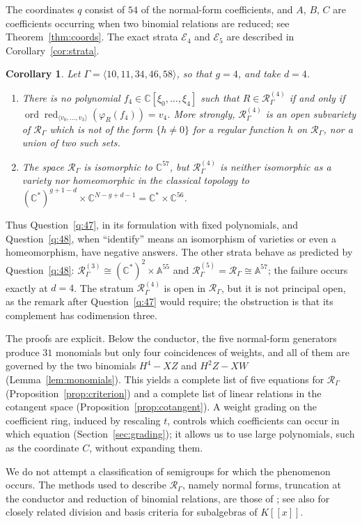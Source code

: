 \documentclass{amsart}
\newtheorem{corollary}[theorem]{Corollary}
\theoremstyle{definition}
\theoremstyle{remark}
\numberwithin{equation}{section}
\newcommand{\CC}{\mathbb{C}}
\newcommand{\AF}{\mathbb{A}}
\newcommand{\Rs}{\mathcal{R}_\Gamma}
\newcommand{\Rd}[1]{\mathcal{R}^{(#1)}_\Gamma}
\newcommand{\Ed}[1]{\mathcal{E}_{#1}}
\DeclareMathOperator{\ord}{ord}
\DeclareMathOperator{\red}{red}
\begin{document}
The coordinates $q$ consist of $54$ of the normal-form coefficients, and $A$, $B$, $C$ are coefficients occurring when two binomial relations are reduced; see Theorem~\ref{thm:coords}. The exact strata $\Ed{4}$ and $\Ed{5}$ are described in Corollary~\ref{cor:strata}.

\begin{corollary}\label{cor:answers}
Let $\Gamma=\langle 10,11,34,46,58\rangle$, so that $g=4$, and take $d=4$.
\begin{enumerate}
\item There is no polynomial $f_4\in\CC[\xi_0,\dots,\xi_4]$ such that $R\in\Rd{4}$ if and only if $\ord\red_{\langle v_0,\dots,v_3\rangle}(\varphi_R(f_4))=v_4$. More strongly, $\Rd{4}$ is an open subvariety of $\Rs$ which is not of the form $\{h\ne0\}$ for a regular function $h$ on $\Rs$, nor a union of two such sets.
\item The space $\Rs$ is isomorphic to $\CC^{57}$, but $\Rd{4}$ is neither isomorphic as a variety nor homeomorphic in the classical topology to $(\CC^*)^{g+1-d}\times\CC^{N-g+d-1}=\CC^*\times\CC^{56}$.
\end{enumerate}
\end{corollary}

Thus Question~\ref{q:47}, in its formulation with fixed polynomials, and Question~\ref{q:48}, when ``identify'' means an isomorphism of varieties or even a homeomorphism, have negative answers. The other strata behave as predicted by Question~\ref{q:48}: $\Rd{3}\cong(\CC^*)^2\times\AF^{55}$ and $\Rd{5}=\Rs\cong\AF^{57}$; the failure occurs exactly at $d=4$. The stratum $\Rd{4}$ is open in $\Rs$, but it is not principal open, as the remark after Question~\ref{q:47} would require; the obstruction is that its complement has codimension three.

The proofs are explicit. Below the conductor, the five normal-form generators produce $31$ monomials but only four coincidences of weights, and all of them are governed by the two binomials $H^4-XZ$ and $H^2Z-XW$ (Lemma~\ref{lem:monomials}). This yields a complete list of five equations for $\Rs$ (Proposition~\ref{prop:criterion}) and a complete list of linear relations in the cotangent space (Proposition~\ref{prop:cotangent}). A weight grading on the coefficient ring, induced by rescaling $t$, controls which coefficients can occur in which equation (Section~\ref{sec:grading}); it allows us to use large polynomials, such as the coordinate $C$, without expanding them.

We do not attempt a classification of semigroups for which the phenomenon occurs. The methods used to describe $\Rs$, namely normal forms, truncation at the conductor and reduction of binomial relations, are those of \cite{Ham20}; see also \cite{AGM17} for closely related division and basis criteria for subalgebras of $K[\![x]\!]$.
\end{document}
